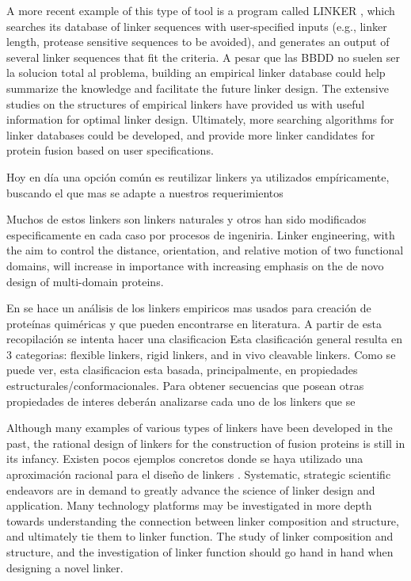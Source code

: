A more recent example of this type of tool is a program called LINKER \cite{crasto2000linker,xue2004linker}, which searches its database of linker sequences with user-specified inputs (e.g., linker length, protease sensitive sequences to be avoided), and generates an output of several linker sequences that fit the criteria.
A pesar que las BBDD no suelen ser la solucion total al problema, building an empirical
linker database could help summarize the knowledge and facilitate the future linker design.
The extensive studies on the structures of empirical linkers have provided us with useful
information for optimal linker design. Ultimately, more searching algorithms for linker
databases could be developed, and provide more linker candidates for protein fusion based
on user specifications.





Hoy en día una opción común es reutilizar linkers ya utilizados empíricamente, buscando el que mas se adapte a nuestros requerimientos 

Muchos de estos linkers son linkers naturales y otros han sido modificados especificamente en cada caso por procesos de ingeniria.
Linker engineering, with the aim to control the distance, orientation, and relative motion of two functional domains, will increase in importance with increasing emphasis on the de novo design of multi-domain proteins.

En \cite{chen2013fusion} se hace un análisis de los linkers empiricos mas usados para creación de proteínas quiméricas y que pueden encontrarse en literatura.
A partir de esta recopilación se intenta hacer una clasificacion 
Esta clasificación general resulta en 3 categorias:
flexible linkers, rigid linkers, and in vivo cleavable linkers. 
Como se puede ver, esta clasificacion esta basada, principalmente, en propiedades estructurales/conformacionales. 
Para obtener secuencias que posean otras propiedades de interes deberán analizarse cada uno de los linkers que se 








Although many examples of various types of linkers have been developed in the past, the rational design of linkers for the construction of fusion proteins is still in its infancy. 
Existen pocos ejemplos concretos donde se haya utilizado una aproximación racional para el diseño de linkers \cite{arai2001design,arai2004conformations}.
Systematic, strategic scientific endeavors are in demand to greatly advance the science of linker design and application.
Many technology platforms may be investigated in more depth towards understanding the
connection between linker composition and structure, and ultimately tie them to linker
function.
The study of linker composition and structure, and the investigation of linker function
should go hand in hand when designing a novel linker.


